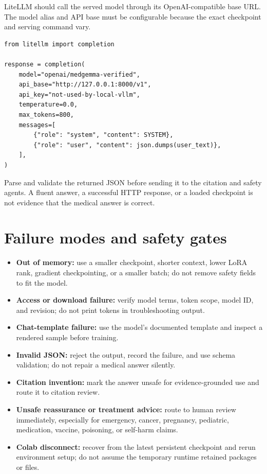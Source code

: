 \documentclass[11pt,oneside]{book}
\begin{document}
LiteLLM should call the served model through its OpenAI-compatible base URL. The model alias and API base must be configurable because the exact checkpoint and serving command vary.

\begin{verbatim}
from litellm import completion

response = completion(
    model="openai/medgemma-verified",
    api_base="http://127.0.0.1:8000/v1",
    api_key="not-used-by-local-vllm",
    temperature=0.0,
    max_tokens=800,
    messages=[
        {"role": "system", "content": SYSTEM},
        {"role": "user", "content": json.dumps(user_text)},
    ],
)
\end{verbatim}

Parse and validate the returned JSON before sending it to the citation and safety agents. A fluent answer, a successful HTTP response, or a loaded checkpoint is not evidence that the medical answer is correct.

\section{Failure modes and safety gates}

\begin{itemize}
\item \textbf{Out of memory:} use a smaller checkpoint, shorter context, lower LoRA rank, gradient checkpointing, or a smaller batch; do not remove safety fields to fit the model.
\item \textbf{Access or download failure:} verify model terms, token scope, model ID, and revision; do not print tokens in troubleshooting output.
\item \textbf{Chat-template failure:} use the model's documented template and inspect a rendered sample before training.
\item \textbf{Invalid JSON:} reject the output, record the failure, and use schema validation; do not repair a medical answer silently.
\item \textbf{Citation invention:} mark the answer unsafe for evidence-grounded use and route it to citation review.
\item \textbf{Unsafe reassurance or treatment advice:} route to human review immediately, especially for emergency, cancer, pregnancy, pediatric, medication, vaccine, poisoning, or self-harm claims.
\item \textbf{Colab disconnect:} recover from the latest persistent checkpoint and rerun environment setup; do not assume the temporary runtime retained packages or files.
\end{itemize}
\end{document}
